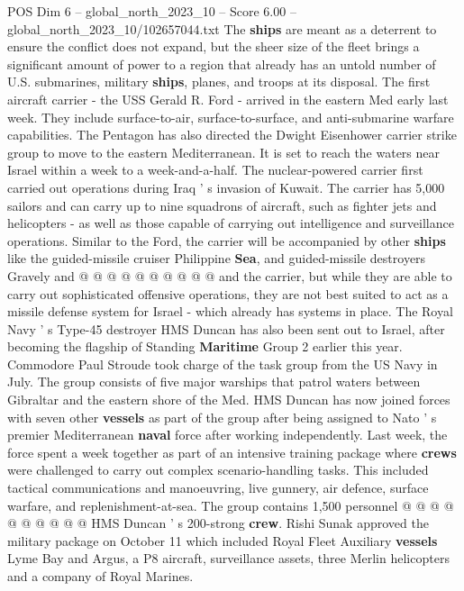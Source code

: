 \begin{textsample}{POS Dim 6 – global\_north\_2023\_10 – Score 6.00 – global\_north\_2023\_10/102657044.txt}  \label{ex:f6_pos_204}
The \textbf{ships} are meant as a deterrent to ensure the conflict does not expand, but the sheer size of the fleet brings a significant amount of power to a region that already has an untold number of U.S. submarines, military \textbf{ships}, planes, and troops at its disposal.
The first aircraft carrier - the USS Gerald R.
Ford - arrived in the eastern Med early last week.
They include surface-to-air, surface-to-surface, and anti-submarine warfare capabilities.
The Pentagon has also directed the Dwight Eisenhower carrier strike group to move to the eastern Mediterranean.
It is set to reach the waters near Israel within a week to a week-and-a-half.
The nuclear-powered carrier first carried out operations during Iraq ' s invasion of Kuwait.
The carrier has 5,000 sailors and can carry up to nine squadrons of aircraft, such as fighter jets and helicopters - as well as those capable of carrying out intelligence and surveillance operations.
Similar to the Ford, the carrier will be accompanied by other \textbf{ships} like the guided-missile cruiser Philippine \textbf{Sea}, and guided-missile destroyers Gravely and @ @ @ @ @ @ @ @ @ @ and the carrier, but while they are able to carry out sophisticated offensive operations, they are not best suited to act as a missile defense system for Israel - which already has systems in place.
The Royal Navy ' s Type-45 destroyer HMS Duncan has also been sent out to Israel, after becoming the flagship of Standing \textbf{Maritime} Group 2 earlier this year.
Commodore Paul Stroude took charge of the task group from the US Navy in July.
The group consists of five major warships that patrol waters between Gibraltar and the eastern shore of the Med.
HMS Duncan has now joined forces with seven other \textbf{vessels} as part of the group after being assigned to Nato ' s premier Mediterranean \textbf{naval} force after working independently.
Last week, the force spent a week together as part of an intensive training package where \textbf{crews} were challenged to carry out complex scenario-handling tasks.
This included tactical communications and manoeuvring, live gunnery, air defence, surface warfare, and replenishment-at-sea.
The group contains 1,500 personnel @ @ @ @ @ @ @ @ @ @ HMS Duncan ' s 200-strong \textbf{crew}.
Rishi Sunak approved the military package on October 11 which included Royal Fleet Auxiliary \textbf{vessels} Lyme Bay and Argus, a P8 aircraft, surveillance assets, three Merlin helicopters and a company of Royal Marines.

\end{textsample}
